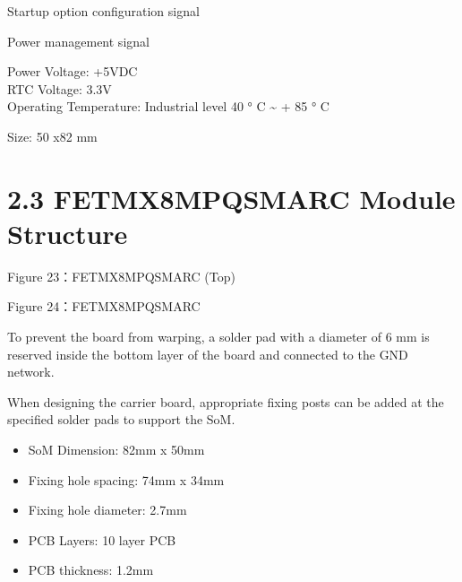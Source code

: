 \documentclass[letterpaper,10pt,openany,english]{sphinxmanual}
\begin{document}
\sphinxAtStartPar
Startup option configuration signal

\sphinxAtStartPar
Power management signal

\sphinxAtStartPar
Power Voltage: +5VDC\\
RTC Voltage: 3.3V\\
Operating Temperature: Industrial level \sphinxhyphen{}40 ° C \textasciitilde{} + 85 ° C

\sphinxAtStartPar
Size: 50 x82 mm\\


\section{2.3 FET\sphinxhyphen{}MX8MPQ\sphinxhyphen{}SMARC Module Structure}
\label{\detokenize{hardware:fet-mx8mpq-smarc-module-structure}}
\sphinxAtStartPar
{}Figure 2\sphinxhyphen{}3：FET\sphinxhyphen{}MX8MPQ\sphinxhyphen{}SMARC (Top)

\sphinxAtStartPar
{}Figure 2\sphinxhyphen{}4：FET\sphinxhyphen{}MX8MPQ\sphinxhyphen{}SMARC

\sphinxAtStartPar
To prevent the board from warping, a solder pad with a diameter of 6 mm is reserved inside the bottom layer of the board and connected to the GND network.

\sphinxAtStartPar
When designing the carrier board, appropriate fixing posts can be added at the specified solder pads to support the SoM.
\begin{itemize}
\item {} 
\sphinxAtStartPar
SoM Dimension: 82mm x 50mm

\item {} 
\sphinxAtStartPar
Fixing hole spacing: 74mm x 34mm

\item {} 
\sphinxAtStartPar
Fixing hole diameter: 2.7mm

\item {} 
\sphinxAtStartPar
PCB Layers: 10 layer PCB

\item {} 
\sphinxAtStartPar
PCB thickness: 1.2mm

\end{itemize}
\end{document}
